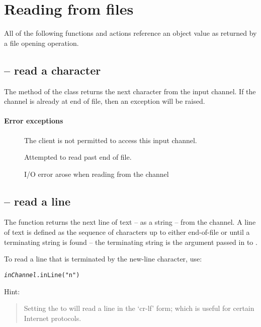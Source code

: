 \section{Reading from files}
\label{io:reading}

All of the following functions and actions reference an  object value as returned by a file opening operation.

\subsection{ -- read a character}
\label{io:inCh}


The  method of the  class returns the next character from the input channel. If the channel is already at end of file, then an exception will be raised.

\paragraph{Error exceptions}
\begin{description}
\item[]
The client is not permitted to access this input channel.
\item[]
Attempted to read past end of file.
\item[]
I/O error arose when reading from the channel
\end{description}

\subsection{ -- read a line}
\label{io:inLine}


The  function returns the next line of text -- as a string -- from the  channel. A line of text is defined as the sequence of characters up to either end-of-file or until a terminating string is found -- the terminating string is the  argument passed in to .

To read a line that is terminated by the new-line character, use:
\begin{alltt}
\emph{inChannel}.inLine("\bsl{}n")
\end{alltt}

Hint:
\begin{quote}
Setting the  to  will read a line in the `cr-lf' form; which is useful for certain Internet protocols.
\end{quote}

